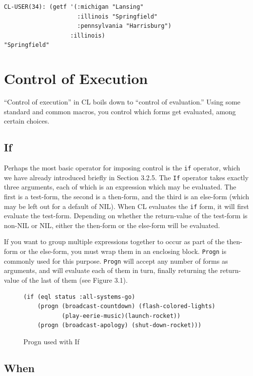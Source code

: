 \begin{verbatim}
CL-USER(34): (getf '(:michigan "Lansing"
                     :illinois "Springfield"
                     :pennsylvania "Harrisburg")
                   :illinois)
"Springfield"
\end{verbatim}

\section{Control of Execution}

``Control of execution'' in CL boils down to ``control of evaluation.'' Using some standard
and common macros, you control which forms get evaluated, among certain choices.

\subsection{If}

Perhaps the most basic operator for imposing control is the \texttt{if} operator, which we have
already introduced briefly in Section 3.2.5. The \texttt{If} operator takes exactly three arguments,
each of which is an expression which may be evaluated. The first is a test-form, the second
is a then-form, and the third is an else-form (which may be left out for a default of NIL).
When CL evaluates the \texttt{if} form, it will first evaluate the test-form. Depending on whether
the return-value of the test-form is non-NIL or NIL, either the then-form or the else-form
will be evaluated.

If you want to group multiple expressions together to occur as part of the then-form or
the else-form, you must wrap them in an enclosing block. \texttt{Progn} is commonly used for this
purpose. \texttt{Progn} will accept any number of forms as arguments, and will evaluate each of
them in turn, finally returning the return-value of the last of them (see Figure 3.1).

\begin{figure}[h]
\begin{verbatim}
(if (eql status :all-systems-go)
    (progn (broadcast-countdown) (flash-colored-lights)
           (play-eerie-music)(launch-rocket))
    (progn (broadcast-apology) (shut-down-rocket)))
\end{verbatim}
\caption{Progn used with If}
\label{fig:progn-if}
\end{figure}

\subsection{When}


